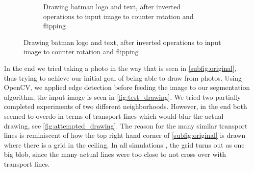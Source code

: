 \begin{figure}[H]
\begin{subfigure}[t]{.24\textwidth}
        \caption{Drawing batman logo and text, after inverted operations to input image to counter rotation and flipping}
        \label{fig:ost}
        \centering
    \end{subfigure}
\end{figure}

In the end we tried taking a photo in the way that is seen in \cref{subfig:original}, thus trying to achieve our initial goal of being able to draw from photos. Using OpenCV\cite{itseez2015opencv}, we applied edge detection before feeding the image to our segmentation algorithm, the input image is seen in \cref{fig:test_drawing}. We tried two partially completed experiments of two different neighborhoods. However, in the end both seemed to overdo in terms of transport lines which would blur the actual drawing, see \cref{fig:attempted_drawing}. The reason for the many similar transport lines is reminiscent of how the top right hand corner of \cref{subfig:original} is drawn where there is a grid in the ceiling. In all simulations , the grid turns out as one big blob, since the many actual lines were too close to not cross over with transport lines.

